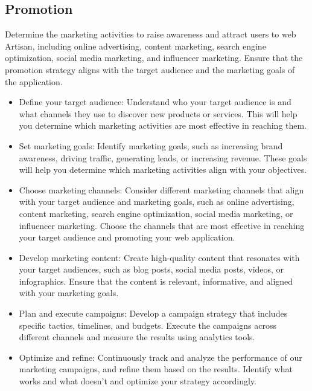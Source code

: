 \documentclass[12pt,a4paper]{article}
\begin{document}
\subsection{Promotion}
Determine the marketing activities to raise awareness and attract users to web Artisan, including online advertising, content marketing, search engine optimization, social media marketing, and influencer marketing. Ensure that the promotion strategy aligns with the target audience and the marketing goals of the application.
\begin{itemize}
    \item Define your target audience: Understand who your target audience is and what channels they use to discover new products or services. This will help you determine which marketing activities are most effective in reaching them.
    \item Set marketing goals: Identify marketing goals, such as increasing brand awareness, driving traffic, generating leads, or increasing revenue. These goals will help you determine which marketing activities align with your objectives.
    \item Choose marketing channels: Consider different marketing channels that align with your target audience and marketing goals, such as online advertising, content marketing, search engine optimization, social media marketing, or influencer marketing. Choose the channels that are most effective in reaching your target audience and promoting your web application.
    \item Develop marketing content: Create high-quality content that resonates with your target audiences, such as blog posts, social media posts, videos, or infographics. Ensure that the content is relevant, informative, and aligned with your marketing goals.
    \item Plan and execute campaigns: Develop a campaign strategy that includes specific tactics, timelines, and budgets. Execute the campaigns across different channels and measure the results using analytics tools.
    \item Optimize and refine: Continuously track and analyze the performance of our  marketing campaigns, and refine them based on the results. Identify what works and what doesn't and optimize your strategy accordingly.
\end{itemize}
\end{document}
